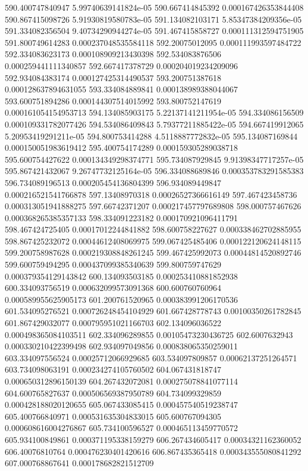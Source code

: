 {590.400747840947 5.99740639141824e-05
590.667414845392 0.000167426353844408
590.867415098726 5.91930819580783e-05
591.134082103171 5.85347384209356e-05
591.334082356504 9.40734290944274e-05
591.467415858727 0.000111312594751905
591.800749614283 0.000237048535584118
592.20075012095 0.000111993597484722
592.334083623173 0.000108909213430398
592.534083876506 0.000259441111340857
592.667417378729 0.000204019234209096
592.934084383174 0.000127425314490537
593.200751387618 0.000128637894631055
593.334084889841 0.000138989388044067
593.600751894286 0.000144307514015992
593.800752147619 0.000161054154953713
594.134085903175 5.22137141211954e-05
594.334086156509 0.000109331782077426
594.534086409843 5.79377211885422e-05
594.667419912065 5.20953419291211e-05
594.800753414288 4.5118887772832e-05
595.134087169844 0.000150051983619412
595.400754174289 0.000159305289038718
595.600754427622 0.000134349298374771
595.734087929845 9.91398347717257e-05
595.867421432067 9.26747732125164e-05
596.334088689846 0.000353783291585383
596.734089196513 0.000205454136804399
596.934089449847 0.000216521541766878
597.13408970318 0.00026527366616149
597.467423458736 0.000313051941888275
597.66742371207 0.000217457797689808
598.000757467626 0.000368265385357133
598.334091223182 0.000170921096411791
598.467424725405 0.00017012244841882
598.600758227627 0.000338462702885955
598.867425232072 0.00044612408069975
599.067425485406 0.000122120624148115
599.200758987628 0.000219308848261245
599.467425992073 0.00044814520892746
599.600759494295 0.000437099385340639
599.800759747629 0.000379354129143842
600.134093503185 0.000253410881852938
600.334093756519 0.000632099573091368
600.600760760964 0.000589955625905173
601.200761520965 0.000383991206170536
601.534095276521 0.000726248454104929
601.667428778743 0.00100350261782845
601.867429032077 0.000795951021166703
602.134096036522 0.000498365084103511
602.334096289855 0.00105473230436725
602.6007632943 0.000330210422399498
602.934097049856 0.000838065350259011
603.334097556524 0.00025712066929685
603.534097809857 0.00062137251264571
603.734098063191 0.000234274105760502
604.067431818747 0.000650312896150139
604.267432072081 0.000275078841077114
604.600765827637 0.000506569387950789
604.734099329859 0.000428188020120655
605.067433085415 0.000457540519238747
605.400766840971 0.000531635304833015
605.600767094305 0.000608616004276867
605.734100596527 0.000465113459770572
605.934100849861 0.000371195338159279
606.267434605417 0.00034321162360052
606.40076810764 0.000476230401420616
606.867435365418 0.000343555080841292
607.000768867641 0.000178682821512709
}

